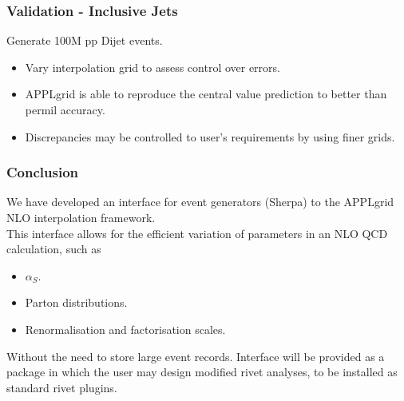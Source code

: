 \documentclass[10pt]{beamer}
\begin{document}
\begin{frame}
\frametitle{Validation - Inclusive Jets}
Generate 100M pp Dijet events. 
\begin{itemize}
\item<1-> Vary interpolation grid to assess control over errors.\\
\end{itemize}


\begin{itemize}
\item<1-> APPLgrid is able to reproduce the central value prediction to better than permil accuracy.
\item<1-> Discrepancies may be controlled to user's requirements by using finer grids.
\end{itemize}

\end{frame}


\begin{frame}
\frametitle{Conclusion}
We have developed an interface for event generators (Sherpa) to the APPLgrid NLO interpolation framework.\\
\vskip10pt
This interface allows for the efficient variation of parameters in an NLO QCD calculation, such as
\begin{itemize}
\item<1-> $\alpha_S$.
\item<1-> Parton distributions.
\item<1-> Renormalisation and factorisation scales.
\end{itemize}
\vskip10pt
Without the need to store large event records.
\vskip10pt
Interface will be provided as a package in which the user may design modified rivet analyses, to be
installed as standard rivet plugins.

\vskip15pt

\end{frame}
\end{document}
